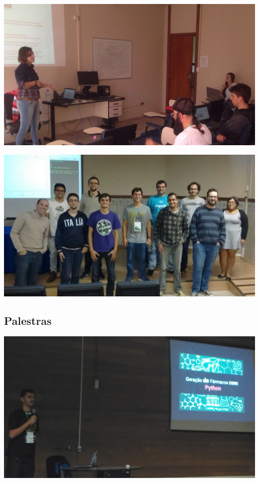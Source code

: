 \documentclass[12pt]{article}
\begin{document}
\noindent  %
\includegraphics[width=\textwidth]{tutorial-pyopencl.jpg}

\noindent  %
\includegraphics[width=\textwidth]{tutorial-rpy.jpg}

\subsection*{Palestras}

\noindent  %
\includegraphics[width=\textwidth]{talks-drugs.jpg}
\end{document}
